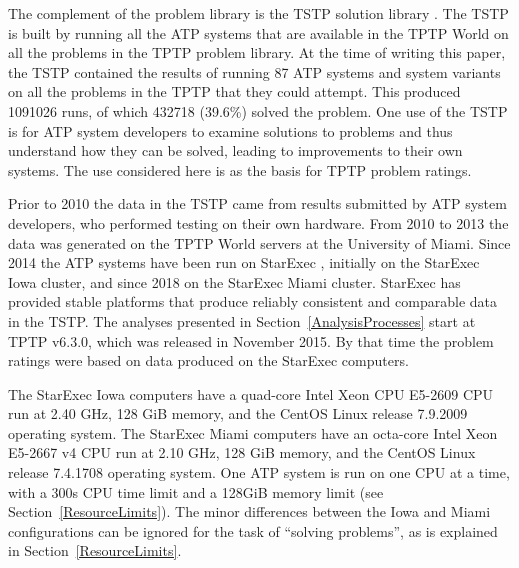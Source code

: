 \documentclass[runningheads]{llncs}
\begin{document}
The complement of the problem library is the TSTP solution library \cite{Sut07-CSR,Sut10}.
The TSTP is built by running all the ATP systems that are available in the TPTP World on
all the problems in the TPTP problem library.
At the time of writing this paper, the TSTP contained the results of running 87 ATP systems and 
system variants on all the problems in the TPTP that they could attempt.
This produced 1091026 runs, of which 432718 (39.6\%) solved the problem.
One use of the TSTP is for ATP system developers to examine solutions to problems and thus 
understand how they can be solved, leading to improvements to their own systems. 
The use considered here is as the basis for TPTP problem ratings.

Prior to 2010 the data in the TSTP came from results submitted by ATP system developers, who
performed testing on their own hardware.
From 2010 to 2013 the data was generated on the TPTP World servers at the University of Miami.
Since 2014 the ATP systems have been run on StarExec \cite{SST14}, initially on the StarExec
Iowa cluster, and since 2018 on the StarExec Miami cluster.
StarExec has provided stable platforms that produce reliably consistent and comparable data in
the TSTP.
The analyses presented in Section~\ref{AnalysisProcesses} start at TPTP v6.3.0, which was released 
in November 2015. 
By that time the problem ratings were 
based on data produced on the StarExec computers.

The StarExec Iowa computers have a
quad-core Intel Xeon CPU E5-2609 CPU run at 2.40 GHz,
128 GiB memory,
and the CentOS Linux release 7.9.2009 operating system.
The StarExec Miami computers have an
octa-core Intel Xeon E5-2667 v4 CPU run at 2.10 GHz,
128 GiB memory,
and the CentOS Linux release 7.4.1708 operating system.
One ATP system is run on one CPU at a time, with a 300s CPU time limit and a 128GiB memory
limit (see Section~\ref{ResourceLimits}).
The minor differences between the Iowa and Miami configurations can be ignored for the task
of ``solving problems'', as is explained in Section~\ref{ResourceLimits}.
\end{document}
